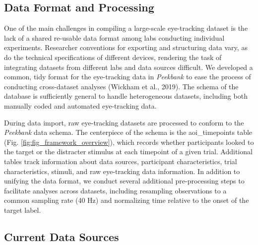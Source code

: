 \documentclass[10pt, letterpaper]{article}
\begin{document}
\hypertarget{data-format-and-processing}{%
\subsection{Data Format and
Processing}\label{data-format-and-processing}}

One of the main challenges in compiling a large-scale eye-tracking
dataset is the lack of a shared re-usable data format among labs
conducting individual experiments. Researcher conventions for exporting
and structuring data vary, as do the technical specifications of
different devices, rendering the task of integrating datasets from
different labs and data sources difficult. We developed a common, tidy
format for the eye-tracking data in \emph{Peekbank} to ease the process
of conducting cross-dataset analyses (Wickham et al., 2019). The schema
of the database is sufficiently general to handle heterogeneous
datasets, including both manually coded and automated eye-tracking data.

During data import, raw eye-tracking datasets are processed to conform
to the \emph{Peekbank} data schema. The centerpiece of the schema is the
aoi\_timepoints table (Fig. \ref{fig:fig_framework_overview}), which
records whether participants looked to the target or the distracter
stimulus at each timepoint of a given trial. Additional tables track
information about data sources, participant characteristics, trial
characteristics, stimuli, and raw eye-tracking data information. In
addition to unifying the data format, we conduct several additional
pre-processing steps to facilitate analyses across datasets, including
resampling observations to a common sampling rate (40 Hz) and
normalizing time relative to the onset of the target label.

\hypertarget{current-data-sources}{%
\subsection{Current Data Sources}\label{current-data-sources}}
\end{document}
